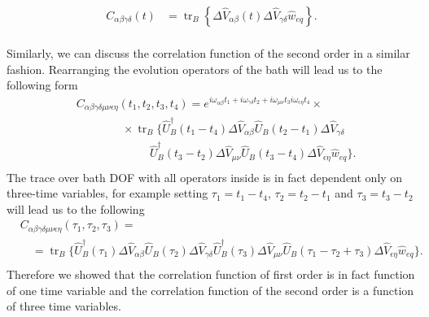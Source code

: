 \begin{equation}
\label{correlation_function_1st_compact_2}
    \begin{aligned}
    C_{\alpha \beta \gamma \delta}(t) &= \operatorname{tr}_B \left\{ \Delta \hat{V}_{\alpha \beta}(t) \Delta \hat{V}_{\gamma \delta} \hat{w}_{eq} \right\}.\\
    \end{aligned}
\end{equation}

Similarly, we can discuss the correlation function of the second order in a similar fashion. 
Rearranging the evolution operators of the bath will lead us to the following form
\begin{equation}
\label{correlation_function_1st_compact_2}
    \begin{aligned}
    &C_{\alpha \beta \gamma \delta \mu \nu \epsilon \eta}(t_1, t_2, t_3, t_4) = e^{i \omega_{\alpha \beta}t_1 + i\omega_{\gamma \delta} t_2 + i\omega_{\mu \nu} t_3 i\omega_{\epsilon \eta} t_4} \times \\
    &\quad \quad \quad \quad \times \operatorname{tr}_B \Big\{ \hat{U}_B^\dagger (t_1-t_4) \Delta \hat{V}_{\alpha \beta} \hat{U}_B (t_2-t_1) \Delta \hat{V}_{\gamma \delta}  \\
    &\quad \quad \quad \quad \quad \quad \:\:  \hat{U}_B^\dagger (t_3-t_2) \Delta \hat{V}_{\mu \nu} \hat{U}_B (t_3-t_4) \Delta \hat{V}_{\epsilon \eta} \hat{w}_{eq}\Big\}. \\
    \end{aligned}
\end{equation}
The trace over bath DOF with all operators inside is in fact dependent only on three-time variables, for example setting $\tau_1 = t_1 - t_4$, $\tau_2 = t_2 - t_1$ and $\tau_3 = t_3 - t_2$ will lead us to the following
\begin{equation}
\label{correlation_function_1st_compact_2}
    \begin{aligned}
    &C_{\alpha \beta \gamma \delta \mu \nu \epsilon \eta}(\tau_1, \tau_2, \tau_3) =  \\
    &\quad = \operatorname{tr}_B \Big\{ \hat{U}_B^\dagger (\tau_1) \Delta \hat{V}_{\alpha \beta} \hat{U}_B (\tau_2) \Delta \hat{V}_{\gamma \delta}\hat{U}_B^\dagger (\tau_3) \Delta \hat{V}_{\mu \nu} \hat{U}_B (\tau_1 - \tau_2 + \tau_3) \Delta \hat{V}_{\epsilon \eta} \hat{w}_{eq}\Big\}. \\
    \end{aligned}
\end{equation}
Therefore we showed that the correlation function of first order is in fact function of one time variable and the correlation function of the second order is a function of three time variables. 